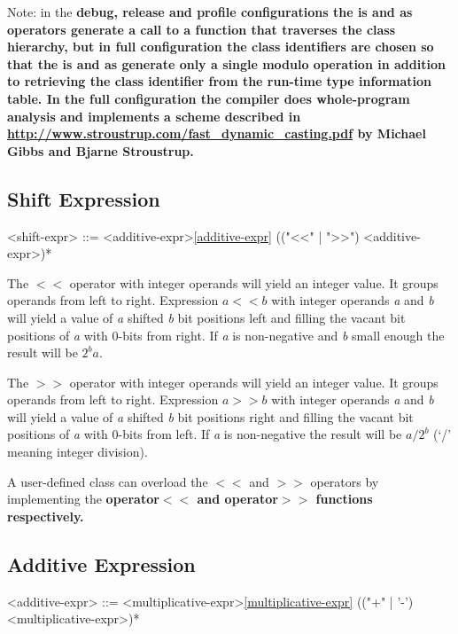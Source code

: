 \documentclass[a4paper,oneside,11pt]{article}
\begin{document}
Note: in the \bf{debug}, \bf{release} and \bf{profile} configurations the \bf{is} and \bf{as} operators generate a call to a function
that traverses the class hierarchy, but in \bf{full} configuration the class identifiers are chosen so that the \bf{is} and \bf{as} generate only
a single modulo operation in addition to retrieving the class identifier from the run-time type information table.
In the \bf{full} configuration the compiler does whole-program analysis and implements a scheme described in
\url {http://www.stroustrup.com/fast_dynamic_casting.pdf} by Michael Gibbs and Bjarne Stroustrup.

\subsection{Shift Expression}

\begin{grammar}
\label{shift-expr}<shift-expr> ::= <additive-expr>\ref{additive-expr} (("<<" | ">>") <additive-expr>)*
\end{grammar}

The $<<$ operator with integer operands will yield an integer value. It groups operands from left to right.
Expression $a << b$ with integer operands \emph{a} and \emph{b} will yield a value of \emph{a} shifted \emph{b} bit positions left and
filling the vacant bit positions of \emph{a} with 0-bits from right.
If \emph{a} is non-negative and \emph{b} small enough the result will be $2^ba$.

The $>>$ operator with integer operands will yield an integer value. It groups operands from left to right.
Expression $a >> b$ with integer operands \emph{a} and \emph{b} will yield a value of \emph{a} shifted \emph{b} bit positions right and
filling the vacant bit positions of \emph{a} with 0-bits from left.
If \emph{a} is non-negative the result will be $a / 2^b$ (`/' meaning integer division).

A user-defined class can overload the $<<$ and $>>$ operators by implementing the \bf{operator$<<$} and \bf{operator$>>$} functions respectively.

\subsection{Additive Expression}

\begin{grammar}
\label{additive-expr}<additive-expr> ::= <multiplicative-expr>\ref{multiplicative-expr} (("+" | '-') <multiplicative-expr>)*
\end{grammar}
\end{document}
